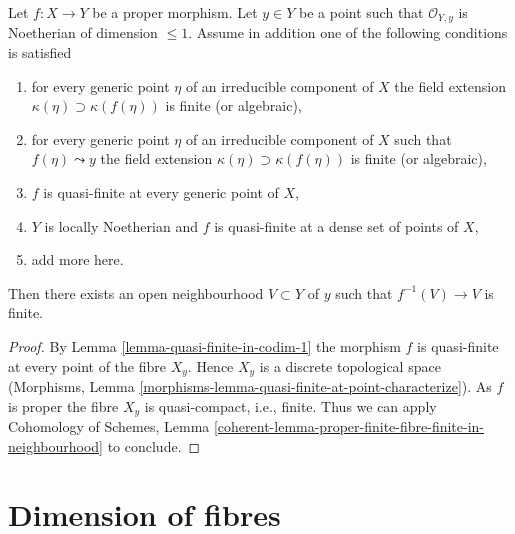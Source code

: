 \begin{lemma}
\label{lemma-finite-in-codim-1}
Let $f : X \to Y$ be a proper morphism. Let $y \in Y$ be a point
such that $\mathcal{O}_{Y, y}$ is Noetherian of dimension $\leq 1$.
Assume in addition one of the following conditions is satisfied
\begin{enumerate}
\item for every generic point $\eta$ of an irreducible component
of $X$ the field extension $\kappa(\eta) \supset \kappa(f(\eta))$
is finite (or algebraic),
\item for every generic point $\eta$ of an irreducible component
of $X$ such that $f(\eta) \leadsto y$ the field extension
$\kappa(\eta) \supset \kappa(f(\eta))$ is finite (or algebraic),
\item $f$ is quasi-finite at every generic point of $X$,
\item $Y$ is locally Noetherian and $f$
is quasi-finite at a dense set of points of $X$,
\item add more here.
\end{enumerate}
Then there exists an open neighbourhood $V \subset Y$ of $y$ such that
$f^{-1}(V) \to V$ is finite.
\end{lemma}

\begin{proof}
By Lemma \ref{lemma-quasi-finite-in-codim-1} the morphism $f$ is
quasi-finite at every point of the fibre $X_y$. Hence
$X_y$ is a discrete topological space
(Morphisms, Lemma \ref{morphisms-lemma-quasi-finite-at-point-characterize}).
As $f$ is proper the fibre $X_y$ is quasi-compact, i.e., finite.
Thus we can apply Cohomology of Schemes, Lemma
\ref{coherent-lemma-proper-finite-fibre-finite-in-neighbourhood}
to conclude.
\end{proof}






\section{Dimension of fibres}
\label{section-dimension-fibres}

